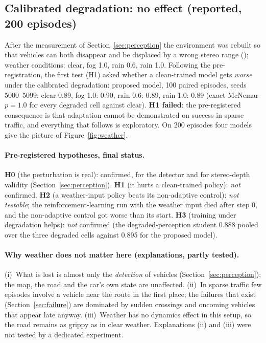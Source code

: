 \subsection{Calibrated degradation: no effect (reported, 200 episodes)}
After the measurement of Section~\ref{sec:perception} the environment was rebuilt so that vehicles can both disappear and be displaced by a wrong stereo range (); weather conditions: clear, fog 1.0, rain 0.6, rain 1.0.
Following the pre-registration, the first test (H1) asked whether a clean-trained model gets \emph{worse} under the calibrated degradation: proposed model, 100 paired episodes, seeds 5000--5099: clear 0.89, fog 1.0: 0.90, rain 0.6: 0.89, rain 1.0: 0.89 (exact McNemar $p=1.0$ for every degraded cell against clear). \textbf{H1 failed}: the pre-registered consequence is that adaptation cannot be demonstrated on success in sparse traffic, and everything that follows is exploratory.
On 200 episodes four models give the picture of Figure~\ref{fig:weather}.


\begin{table}[H]\centering\small
\caption{Full numbers for Figure~\ref{fig:weather}.}\label{tab:weather}
\resizebox{\textwidth}{!}{}
\end{table}

\paragraph{Pre-registered hypotheses, final status.}
\textbf{H0} (the perturbation is real): confirmed, for the detector and for stereo-depth validity (Section~\ref{sec:perception}).
\textbf{H1} (it hurts a clean-trained policy): \emph{not} confirmed.
\textbf{H2} (a weather-input policy beats its non-adaptive control): \emph{not testable}; the reinforcement-learning run with the weather input died after step 0, and the non-adaptive control got worse than its start.
\textbf{H3} (training under degradation helps): \emph{not} confirmed (the degraded-perception student 0.888 pooled over the three degraded cells against 0.895 for the proposed model).

\paragraph{Why weather does not matter here (explanations, partly tested).}
(i)~What is lost is almost only the \emph{detection} of vehicles (Section~\ref{sec:perception}); the map, the road and the car's own state are unaffected. (ii)~In sparse traffic few episodes involve a vehicle near the route in the first place; the failures that exist (Section~\ref{sec:failure}) are dominated by sudden crossings and oncoming vehicles that appear late anyway.
(iii)~Weather has no dynamics effect in this setup, so the road remains as grippy as in clear weather. Explanations (ii) and (iii) were not tested by a dedicated experiment.


